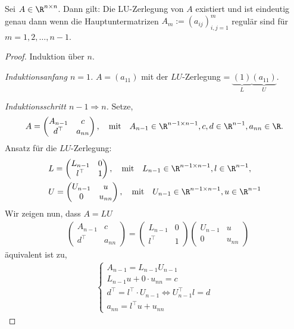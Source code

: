 \begin{prop}
\label{prop:2.2}
Sei $A\in\R^{n\times n}$. Dann gilt: Die LU-Zerlegung von $A$ existiert und ist
eindeutig genau dann wenn die Hauptuntermatrizen $A_m := (a_{ij})_{i,j=1}^m$
regulär sind für $m=1,2,\ldots,n-1$.\fishhere
\end{prop}%
\begin{proof}
Induktion über $n$.

\textit{Induktionsanfang $n=1$.} $A=(a_{11})$ mit der $LU$-Zerlegung =
$\underbrace{(1)}_{L}\underbrace{(a_{11})}_{U}$.

\textit{Induktionsschritt $n-1\Rightarrow n$.} Setze,
\begin{align*}
A=\begin{pmatrix}
A_{n-1} & c\\
d^\top & a_{nn}
\end{pmatrix},
\quad\text{mit}\quad A_{n-1}\in\R^{n-1\times n-1}, c,d\in\R^{n-1}, a_{nn}\in\R.
\end{align*}
Ansatz für die $LU$-Zerlegung:
\begin{align*}
&L =
\begin{pmatrix}
L_{n-1} & 0\\
l^\top & 1 
\end{pmatrix},
\quad\text{mit}\quad L_{n-1}\in\R^{n-1\times n-1}, l\in\R^{n-1},\\
&U =
\begin{pmatrix}
U_{n-1} & u\\
0 & u_{nn}
\end{pmatrix},
\quad\text{mit}\quad U_{n-1}\in\R^{n-1\times n-1}, u\in\R^{n-1}
\end{align*}
Wir zeigen nun, dass $A=LU$
\begin{align*}
&\begin{pmatrix}
A_{n-1} & c\\
d^\top & a_{nn}
\end{pmatrix}
= \begin{pmatrix}
L_{n-1} & 0\\
l^\top & 1 
\end{pmatrix}
\begin{pmatrix}
U_{n-1} & u\\
0 & u_{nn}
\end{pmatrix}
\end{align*}
äquivalent ist zu,
\begin{align*}
\begin{cases}
A_{n-1} = L_{n-1}U_{n-1}\\
L_{n-1}u + 0\cdot u_{nn} = c\\
d^\top = l^\top\cdot U_{n-1} \Leftrightarrow U_{n-1}^\top l = d\\
a_{nn} = l^\top u + u_{nn}
\end{cases}
\end{align*}


\end{proof}
